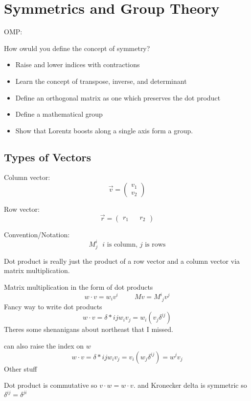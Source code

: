 \documentclass{report}
\begin{document}
\chapter{Symmetrics and Group Theory}
OMP:

How owuld you define the concept of symmetry?

\begin{itemize}
\item
Raise and lower indices with contractions

\item
Learn the concept of transpose, inverse, and determinant

\item
Define an orthogonal matrix as one which preserves the dot product

\item 
Define a mathematical group 

\item 
Show that Lorentz boosts along a single axis form a group.

\end{itemize}

\section{Types of Vectors}
Column vector:
\[
\vec{v} = \begin{pmatrix} v_1 \\ v_2 \end{pmatrix}
\]

Row vector:
\[
\vec{r} = \begin{pmatrix} r_1 && r_2 \end{pmatrix}
\]

Convention/Notation:
\[
M^i_j \textrm{ $i$ is column, $j$ is rows}
\]

Dot product is really just the product of a row vector and a column vector via matrix multiplication.

Matrix multiplication in the form of dot products
\[
w \cdot v = w_i v^i \hspace{1cm} Mv = M^i_{\,\,j} v^j
\]
Fancy way to write dot products
\[
w \cdot v = \delta*{ij}w_iv_j = w_i(v_j \delta^{ij})
\]
Theres some shenanigans about northeast that I missed.

can also raise the index on $w$
\[
w \cdot v = \delta*{ij}w_iv_j = v_i(w_j \delta^{ij}) = w^jv_j
\]
Other stuff

Dot product is commutative so $v \cdot w = w \cdot v$. and Kronecker delta is symmetric so $\delta^{ij} = \delta^{ji}$
\end{document}
